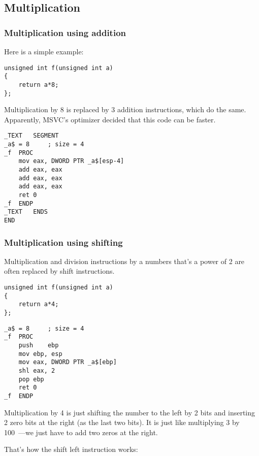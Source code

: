 ﻿\subsection{Multiplication}

\subsubsection{Multiplication using addition}

Here is a simple example:

\begin{lstlisting}[style=customc]
unsigned int f(unsigned int a)
{
	return a*8;
};
\end{lstlisting}

Multiplication by 8 is replaced by 3 addition instructions, which do the same.
Apparently, MSVC's optimizer decided that this code can be faster.

\begin{lstlisting}[caption=\Optimizing MSVC 2010,style=customasmx86]
_TEXT	SEGMENT
_a$ = 8		; size = 4
_f	PROC
	mov	eax, DWORD PTR _a$[esp-4]
	add	eax, eax
	add	eax, eax
	add	eax, eax
	ret	0
_f	ENDP
_TEXT	ENDS
END
\end{lstlisting}

\subsubsection{Multiplication using shifting}
\label{subsec:mult_using_shifts}

Multiplication and division instructions by a numbers that's a power of 2 are often replaced by shift instructions.

\begin{lstlisting}[style=customc]
unsigned int f(unsigned int a)
{
	return a*4;
};
\end{lstlisting}

\begin{lstlisting}[caption=\NonOptimizing MSVC 2010,style=customasmx86]
_a$ = 8		; size = 4
_f	PROC
	push	ebp
	mov	ebp, esp
	mov	eax, DWORD PTR _a$[ebp]
	shl	eax, 2
	pop	ebp
	ret	0
_f	ENDP
\end{lstlisting}


Multiplication by 4 is just shifting the number to the left by 2 bits
and inserting 2 zero bits at the right (as the last two bits).
It is just like multiplying 3 by 100~---we just have to add two zeros at the right.

That's how the shift left instruction works:

